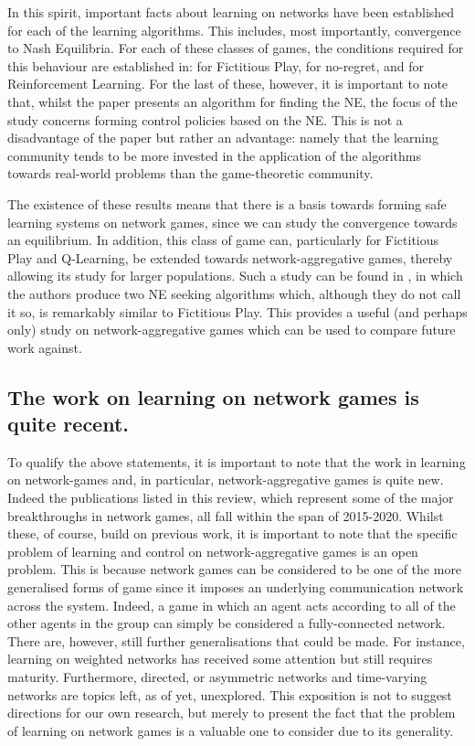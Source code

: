 \documentclass{article}
\begin{document}
In this spirit, important facts about learning on networks have been established for each of the
learning algorithms. This includes, most importantly, convergence to Nash Equilibria. For each of
these classes of games, the conditions required for this behaviour are established in: 
\cite{Ewerhart2019} for Fictitious Play, \cite{Nagarajan2018} for no-regret, and
\cite{Li2017} for Reinforcement Learning. For the last of these, however, it is important to note that,
whilst the paper presents an algorithm for finding the NE, the focus of the study concerns forming
control policies based on the NE. This is not a disadvantage of the paper but rather an advantage:
namely that the learning community tends to be more invested in the application of the algorithms
towards real-world problems than the game-theoretic community.

The existence of these results means that there is a basis towards forming safe learning systems on
network games, since we can study the convergence towards an equilibrium. In addition, this class of
game can, particularly for Fictitious Play and Q-Learning, be extended towards network-aggregative
games, thereby allowing its study for larger populations. Such a study can be found in \cite{Parise},
in which the authors produce two NE seeking algorithms which, although they do not call it so,
is remarkably similar to Fictitious Play. This provides a useful (and perhaps only) study on
network-aggregative games which can be used to compare future work against.

\subsection*{The work on learning on network games is quite recent.} 

To qualify the above statements, it is important to note that the work in learning on network-games
and, in particular, network-aggregative games is quite new. Indeed the publications listed in this
review, which represent some of the major breakthroughs in network games, all fall within the span
of 2015-2020. Whilst these, of course, build on previous work, it is important to note that the
specific problem of learning and control on network-aggregative games is an open problem. This is
because network games can be considered to be one of the more generalised forms of game since it
imposes an underlying communication network across the system. Indeed, a game in which an agent acts
according to all of the other agents in the group can simply be considered a fully-connected
network. There are, however, still further generalisations that could be made. For instance,
learning on  weighted networks has received some attention \cite{Bayer2019} but still
requires maturity. Furthermore, directed, or asymmetric networks and time-varying networks are
topics left, as of yet, unexplored. This exposition is not to suggest directions for our own
research, but merely to present the fact that the problem of learning on network games is a valuable
one to consider due to its generality.
\end{document}
